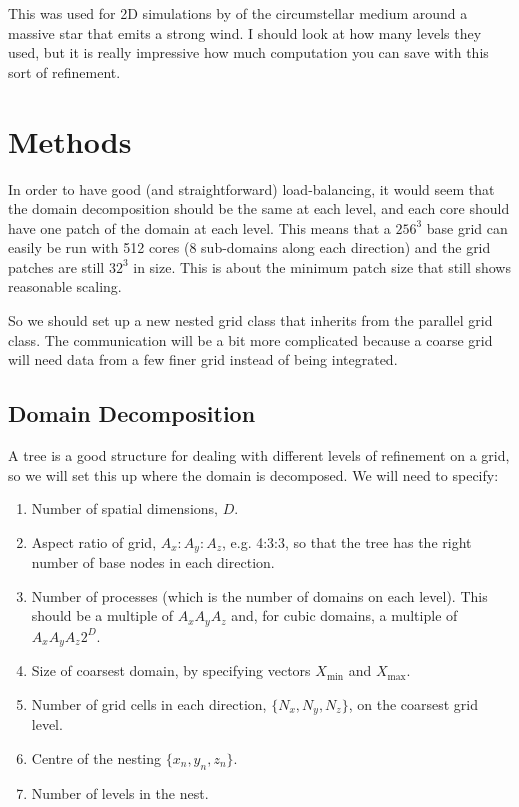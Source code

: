 \documentclass[a4paper,11pt]{article}
\begin{document}
This was used for 2D simulations by \citet{FreHenYor03, FreHenYor06} of the circumstellar medium around a massive star that emits a strong wind.
I should look at how many levels they used, but it is really impressive how much computation you can save with this sort of refinement.

\section{Methods}
In order to have good (and straightforward) load-balancing, it would seem that the domain decomposition should be the same at each level, and each core should have one patch of the domain at each level.
This means that a $256^3$ base grid can easily be run with 512 cores (8 sub-domains along each direction) and the grid patches are still $32^3$ in size.
This is about the minimum patch size that still shows reasonable scaling.

So we should set up a new nested grid class that inherits from the parallel grid class.
The communication will be a bit more complicated because a coarse grid will need data from a few finer grid instead of being integrated.


\subsection{Domain Decomposition}
A tree is a good structure for dealing with different levels of refinement on a grid, so we will set this up where the domain is decomposed.
We will need to specify:
\begin{enumerate}
\item Number of spatial dimensions, $D$.
\item Aspect ratio of grid, $A_x:A_y:A_z$, e.g. 4:3:3, so that the tree has the right number of base nodes in each direction.
\item Number of processes (which is the number of domains on each level).
This should be a multiple of $A_xA_yA_z$ and, for cubic domains, a multiple of $A_xA_yA_z2^D$.
\item Size of coarsest domain, by specifying vectors $X_\mathrm{min}$ and $X_\mathrm{max}$.
\item Number of grid cells in each direction, $\{N_x,N_y,N_z\}$, on the coarsest grid level.
\item Centre of the nesting $\{x_n,y_n,z_n\}$.
\item Number of levels in the nest.
\end{enumerate}
\end{document}
